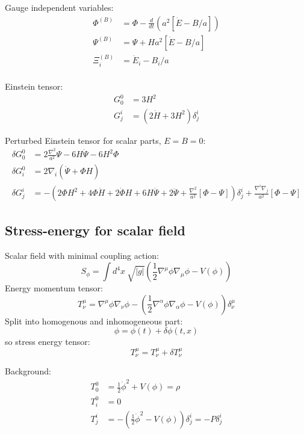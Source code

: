 Gauge independent variables:
\begin{align}
  \Phi^{(B)} &=  \Phi - \frac{d}{dt}(a^2[\dot{E}-B/a]) \\
  \Psi^{(B)} &=  \Psi + Ha^2[\dot{E}-B/a] \\
  \Xi^{(B)}_i &= \dot{E}_i - B_i/a\\
\end{align}

Einstein tensor:
\begin{align}
  G^{0}_{0} &= 3 H^2 \\
  G^{i}_{j} &= \left( 2\dot{H} + 3H^2 \right)\delta^{i}_{j}
\end{align}

Perturbed Einstein tensor for scalar parts, $E=B=0$:
\begin{align}
  \delta G^{0}_{0} &= 2\frac{\nabla^2}{a^2} \Psi -6H\dot{\Psi} -6H^2\Phi\\
  \delta G^{0}_{i} &= 2\nabla_i(\dot{\Psi} + \Phi H) \\
  \delta G^{i}_{j} &= -\left( 2 \Phi H^2 +4 \Phi \dot{H} + 2\dot{\Phi}H +6H\dot{\Psi} +2 \ddot{\Psi} + \frac{\nabla^2}{a^2}[\Phi-\Psi] \right)\delta^{i}_{j} + \frac{\nabla^{i}\nabla_{j}}{a^2}[\Phi-\Psi]
\end{align}

\subsection{Stress-energy for scalar field}
Scalar field with minimal coupling action:
\begin{equation}
  S_\phi = \int d^4x\:\sqrt{|g|}\left( \frac{1}{2}\nabla^\mu\phi\nabla_\mu\phi - V(\phi) \right)
\end{equation}
Energy momentum tensor:
\begin{equation}
  T^{\mu}_{\nu} = \nabla^\mu\phi\nabla_\nu\phi - \left( \frac{1}{2}\nabla^\alpha\phi \nabla_\alpha\phi - V(\phi)  \right)\delta^{\mu}_{\nu}
\end{equation}
Split into homogenous and inhomogeneous part:
\begin{equation}
  \phi = \phi(t) + \delta\phi(t,x)
\end{equation}
so stress energy tensor:
\begin{equation}
  T^{\mu}_{\nu} = T^{\mu}_{\nu} + \delta T^{\mu}_{\nu}
\end{equation}

Background:
\begin{align}
  T^{0}_{0} &= \frac{1}{2}\dot{\phi}^2 + V(\phi) = \rho \\
  T^{0}_{i} &= 0 \\
  T^{i}_{j} &= -\left( \frac{1}{2}\dot{\phi}^2 - V(\phi) \right)\delta^{i}_{j} = -P\delta^{i}_{j}
\end{align}

